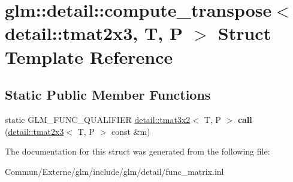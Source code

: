 \hypertarget{structglm_1_1detail_1_1compute__transpose_3_01detail_1_1tmat2x3_00_01_t_00_01_p_01_4}{}\section{glm\+:\+:detail\+:\+:compute\+\_\+transpose$<$ detail\+:\+:tmat2x3, T, P $>$ Struct Template Reference}
\label{structglm_1_1detail_1_1compute__transpose_3_01detail_1_1tmat2x3_00_01_t_00_01_p_01_4}
\subsection*{Static Public Member Functions}
\begin{DoxyCompactItemize}
\item 
static G\+L\+M\+\_\+\+F\+U\+N\+C\+\_\+\+Q\+U\+A\+L\+I\+F\+I\+ER \hyperlink{structglm_1_1detail_1_1tmat3x2}{detail\+::tmat3x2}$<$ T, P $>$ {\bfseries call} (\hyperlink{structglm_1_1detail_1_1tmat2x3}{detail\+::tmat2x3}$<$ T, P $>$ const \&m)\hypertarget{structglm_1_1detail_1_1compute__transpose_3_01detail_1_1tmat2x3_00_01_t_00_01_p_01_4_a4eb080988185ee66f639a17c9a6f548d}{}\label{structglm_1_1detail_1_1compute__transpose_3_01detail_1_1tmat2x3_00_01_t_00_01_p_01_4_a4eb080988185ee66f639a17c9a6f548d}

\end{DoxyCompactItemize}


The documentation for this struct was generated from the following file\+:\begin{DoxyCompactItemize}
\item 
Commun/\+Externe/glm/include/glm/detail/func\+\_\+matrix.\+inl\end{DoxyCompactItemize}
